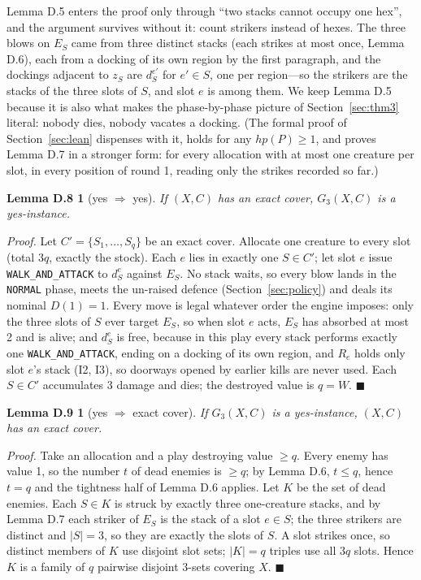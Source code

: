 \documentclass[11pt,a4paper]{article}
\theoremstyle{plain}
\newtheorem*{lemyes}{Lemma D.8}
\newtheorem*{lemcover}{Lemma D.9}
\theoremstyle{definition}
\theoremstyle{plain}
\theoremstyle{definition}
\theoremstyle{remark}
\newcommand{\qedbox}{\hfill$\blacksquare$}
\begin{document}
Lemma D.5 enters the proof only through ``two stacks cannot occupy one hex'', and the argument
survives without it: count strikers instead of hexes. The three blows on $E_S$ came from three
distinct stacks (each strikes at most once, Lemma D.6), each from a docking of its own region
by the first paragraph, and the dockings adjacent to $z_S$ are $d_S^{e'}$ for $e'\in S$, one
per region---so the strikers are the stacks of the three slots of $S$, and slot $e$ is among
them. We keep Lemma D.5 because it is also what makes the phase-by-phase picture of
Section~\ref{sec:thm3} literal: nobody dies, nobody vacates a docking. (The formal proof of
Section~\ref{sec:lean} dispenses with it, holds for any $\mathit{hp}(P)\ge 1$, and proves
Lemma D.7 in a stronger form: for every allocation with at most one creature per slot, in
every position of round 1, reading only the strikes recorded so far.)

\begin{lemyes}[yes $\Longrightarrow$ yes]
If $(X,C)$ has an exact cover, $G_3(X,C)$ is a yes-instance.
\end{lemyes}

\noindent\emph{Proof.} Let $C'=\{S_1,\dots,S_q\}$ be an exact cover. Allocate one creature to
every slot (total $3q$, exactly the stock). Each $e$ lies in exactly one $S\in C'$; let slot $e$
issue \texttt{WALK\_AND\_ATTACK} to $d_S^e$ against $E_S$. No stack waits, so every blow lands in
the \texttt{NORMAL} phase, meets the un-raised defence (Section~\ref{sec:policy}) and deals its
nominal $D(1)=1$. Every move is legal whatever order the engine imposes: only the three slots of
$S$ ever target $E_S$, so when slot $e$ acts, $E_S$ has absorbed at most 2 and is alive; and
$d_S^e$ is free, because in this play every stack performs exactly one
\texttt{WALK\_AND\_ATTACK}, ending on a docking of its own region, and $R_e$ holds only slot
$e$'s stack (I2, I3), so doorways opened by earlier kills are never used. Each $S\in C'$ accumulates 3 damage and dies; the destroyed value is $q=W$.
\qedbox

\begin{lemcover}[yes $\Longrightarrow$ exact cover]
If $G_3(X,C)$ is a yes-instance, $(X,C)$ has an exact cover.
\end{lemcover}

\noindent\emph{Proof.} Take an allocation and a play destroying value $\ge q$. Every enemy has
value 1, so the number $t$ of dead enemies is $\ge q$; by Lemma D.6, $t\le q$, hence $t=q$ and
the tightness half of Lemma D.6 applies. Let $K$ be the set of dead enemies. Each $S\in K$ is
struck by exactly three one-creature stacks, and by Lemma D.7 each striker of $E_S$ is the stack
of a slot $e\in S$; the three strikers are distinct and $|S|=3$, so they are exactly the slots of
$S$. A slot strikes once, so distinct members of $K$ use disjoint slot sets; $|K|=q$ triples use
all $3q$ slots. Hence $K$ is a family of $q$ pairwise disjoint 3-sets covering $X$. \qedbox
\end{document}
